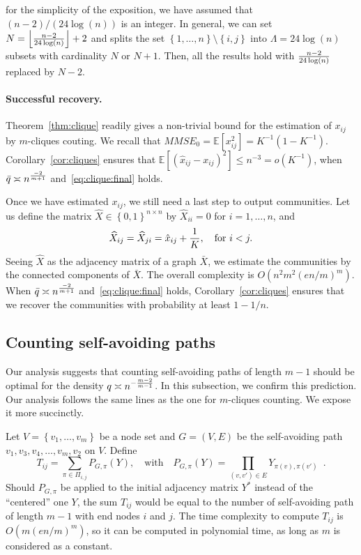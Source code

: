 \documentclass[final]{colt2026}
\newcommand{\1}{\mathbf{1}}
\newcommand{\nico}[1]{\textcolor{red}{[Nicolas: #1]}}
\newcommand{\bbE}{\mathbb{E}}
\newcommand{\pa}[1]{\left(#1\right)}
\newcommand{\ac}[1]{\left\{#1\right\}}
\newcommand{\cro}[1]{\left[#1\right]}
\begin{document}
\medskip

 for the simplicity of the exposition, we have assumed that $(n-2)/(24\log(n))$ is an integer. In general, we can set $N=\left\lfloor {n-2\over 24 \log(n)}\right\rfloor+2$ and splits the set $\ac{1,\ldots,n}\setminus\ac{i,j}$ into $\Lambda=24\log(n)$ subsets with cardinality $N$ or $N+1$. Then, all the results hold with ${n-2\over 24 \log(n)}$ replaced by $N-2$. 



\paragraph{Successful recovery.} 
Theorem~\ref{thm:clique} readily gives a non-trivial bound for the estimation of $x_{ij}$ by $m$-cliques couting. We recall that $MMSE_{0}=\bbE[x_{ij}^2]=K^{-1}(1-K^{-1})$. Corollary~\ref{cor:cliques} ensures that $\bbE\cro{\pa{\hat x_{ij}-x_{ij}}^2}\leq n^{-3}=o(K^{-1})$, when $\bar q\asymp n^{-2\over m+1}$ and~\eqref{eq:clique:final} holds. 

Once we have estimated $x_{ij}$, we still need a last step to output communities. 
Let us define the matrix $\widehat X\in \ac{0,1}^{n\times n}$ by $\widehat X_{ii}=0$ for $i=1,\ldots,n$, and \label{clust:scheme}
$$\widehat X_{ij}=\widehat X_{ji}=\hat x_{ij}+{1\over K},\quad \text{for}\ i<j.$$
 Seeing $\widehat X$ as the adjacency matrix of a graph $\bar X$, we estimate the communities by the connected components of $\bar X$. The overall complexity is $O(n^2m^2(en/m)^m)$.
When $\bar q\asymp n^{-2\over m+1}$ and~\eqref{eq:clique:final} holds, Corollary~\ref{cor:cliques}
ensures that we recover the communities with probability at least $1-1/n$.



\subsection{Counting self-avoiding paths}\label{sec:SAP-counting}

Our analysis suggests that counting self-avoiding paths of length $m-1$ should be optimal for the  density $q\asymp n^{-{m-2\over m-1}}$. In this subsection, we confirm this prediction. Our analysis follows the same lines as the one for $m$-cliques counting. We expose it more succinctly. 
 
Let $V=\ac{v_{1},\ldots,v_{m}}$ be a node set and   $G=(V,E)$ be the self-avoiding path $v_1, v_3,v_4,\ldots, v_{m},v_2$ on $V$. Define
\begin{equation}\label{eq:def:T}
T_{ij}=\sum_{\pi \in \Pi_{i,j}} P_{G,\pi}(Y),\quad \text{with}\quad P_{G,\pi}(Y)=\prod_{(v,v')\in E}Y_{\pi(v),\pi(v')}\enspace .
\end{equation}
Should $P_{G,\pi}$ be applied to the initial adjacency matrix $Y^*$ instead of the ``centered'' one $Y$, the sum  $T_{ij}$ would be equal to the number of self-avoiding path of length $m-1$ with end nodes  $i$ and $j$. 
The time complexity to compute $T_{ij}$ is  $O(m(en/m)^m)$, so it can be computed in polynomial time, as long as $m$ is considered as a constant.
\end{document}
